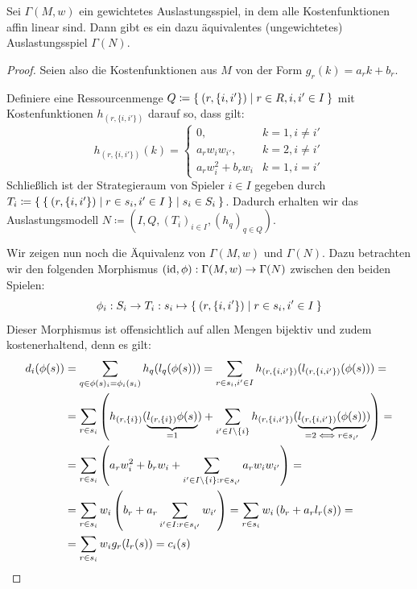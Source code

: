 
\begin{satz}
	Sei $\Gamma(M,w)$ ein gewichtetes Auslastungsspiel, in dem alle Kostenfunktionen affin linear sind. Dann gibt es ein dazu äquivalentes (ungewichtetes) Auslastungsspiel $\Gamma(N)$. 
\end{satz}

\begin{proof}
	Seien also die Kostenfunktionen aus $M$ von der Form $g_r(k) = a_r k + b_r$.
	
	Definiere eine Ressourcenmenge $Q \coloneqq \Set{(r, \{i, i'\}) | r \in R, i,i' \in I}$ mit Kostenfunktionen $h_{(r, \{i,i'\})}$ darauf so, dass gilt:
		\[h_{(r, \{i,i'\})} (k) = \begin{cases}
			0, 					& k=1, i \neq i' \\
			a_r w_i w_{i'}, 	& k=2, i \neq i' \\
			a_r w_i^2 + b_r w_i	& k=1, i = i'
		\end{cases} \]
	Schließlich ist der Strategieraum von Spieler $i \in I$ gegeben durch $T_i \coloneqq \Set{\Set{(r, \{i, i'\}) | r \in s_i, i' \in I} | s_i \in S_i }$. Dadurch erhalten wir das Auslastungsmodell $N \coloneqq (I, Q, (T_i)_{i \in I}, (h_q)_{q \in Q})$. 
	
	Wir zeigen nun noch die Äquivalenz von $\Gamma(M,w)$ und $\Gamma(N)$. Dazu betrachten wir den folgenden Morphismus $(\mathrm{id}, \phi): \Gamma(M,w) \to \Gamma(N)$ zwischen den beiden Spielen:
		\[\phi_i: S_i \to T_i: s_i \mapsto \Set{(r, \{i, i'\}) | r \in s_i, i' \in I}\]
	Dieser Morphismus ist offensichtlich auf allen Mengen bijektiv und zudem kostenerhaltend, denn es gilt:
	\begin{align*}
		d_i(\phi(s)) 	&= \sum_{q \in \phi(s)_i = \phi_i(s_i)} h_q(l_q(\phi(s))) = \sum_{r \in s_i, i' \in I} h_{(r, \{i,i'\})}(l_{(r, \{i,i'\})}(\phi(s))) = \\
						&= \sum_{r \in s_i} \left(h_{(r, \{i\})}(\underbrace{l_{(r, \{i\})}\phi(s)}_{=1}) + \sum_{i' \in I\setminus\{i\}} h_{(r, \{i, i'\})}(\underbrace{l_{(r, \{i, i'\})}(\phi(s))}_{=2 \iff r \in s_{i'}})\right) = \\
						&= \sum_{r \in s_i}\left( a_r w_i^2 + b_r w_i + \sum_{i' \in I\setminus\{i\}: r \in s_{i'}} a_r w_i w_{i'}\right) = \\
						&= \sum_{r \in s_i}w_i \left( b_r + a_r \sum_{i' \in I: r \in s_{i'}}w_{i'} \right) = \sum_{r \in s_i}w_i \left( b_r + a_r l_r(s)\right) = \\
						&= \sum_{r \in s_i}w_i g_r(l_r(s)) = c_i(s) \qedhere
	\end{align*}
\end{proof}

